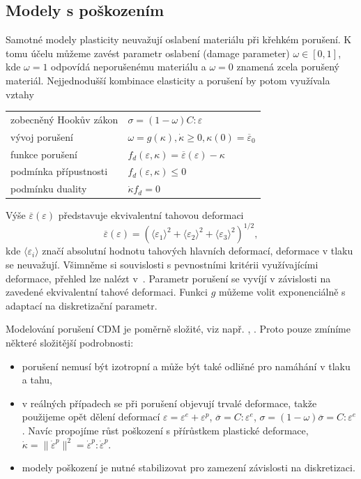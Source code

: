 \documentclass{article}
\begin{document}
\subsection{Modely s poškozením}
Samotné modely plasticity neuvažují oslabení materiálu při křehkém porušení. K tomu účelu můžeme zavést parametr oslabení (damage parameter) $\omega\in[0,1]$, kde $\omega = 1$ odpovídá neporušenému materiálu a $\omega = 0$ znamená zcela porušený materiál. Nejjednodušší kombinace elasticity a porušení by potom využívala vztahy
\begin{table}[h!]
	\centering
	\begin{tabular}{ll}
		\hline
		zobecněný Hookův zákon & $\sigma = (1-\omega)C : \varepsilon$\\
		vývoj porušení & $\omega = g(\kappa), \dot{\kappa} \geq 0, \kappa(0) = \overline{\varepsilon}_0$\\
		funkce porušení & $f_d(\varepsilon,\kappa)=\overline{\varepsilon}(\varepsilon)-\kappa$\\
		podmínka přípustnosti & $f_d(\varepsilon,\kappa)\leq 0$ \\
		podmínku duality & $\dot{\kappa} f_d =0$\\
		\hline
	\end{tabular}
\end{table}

Výše $\overline{\varepsilon}(\varepsilon)$ představuje ekvivalentní tahovou deformaci
$$
	\overline{\varepsilon}(\varepsilon) = (\langle\varepsilon_1\rangle^2+\langle\varepsilon_2\rangle^2+\langle\varepsilon_3\rangle^2)^{1/2},
$$
kde $\langle\varepsilon_i\rangle$ značí absolutní hodnotu tahových hlavních deformací, deformace v
tlaku se neuvažují. Všimněme si souvislosti s pevnostními kritérii využívajícími deformace, přehled lze nalézt v~\cite{kwasniewski_strain_based_2010}.
Parametr porušení se vyvíjí v závislosti na zavedené ekvivalentní tahové deformaci. Funkci $g$ můžeme volit exponenciálně s adaptací na diskretizační parametr.

Modelování porušení CDM je poměrně složité, viz např. \cite{Lemaitre1992}, \cite{Neto2011}. Proto pouze zmíníme některé složitější podrobnosti:
\begin{itemize}
	\item porušení nemusí být izotropní a může být také odlišné pro namáhání v tlaku a tahu,
	\item v reálných případech se při porušení objevují trvalé deformace, takže
	použijeme opět dělení deformací $\varepsilon=\varepsilon^e + \varepsilon^p$, $\overline{\sigma} = C : \varepsilon^e$, $\sigma = (1-\omega)\overline{\sigma} = C : \varepsilon^e$. Navíc propojíme růst poškození s přírůstkem plastické deformace, $\dot{\kappa} = \|\dot{\varepsilon}^p\|^2 = \dot{\varepsilon}^p : \dot{\varepsilon}^p$.
	\item modely poškození je nutné stabilizovat pro zamezení závislosti na diskretizaci.
\end{itemize}
\end{document}
